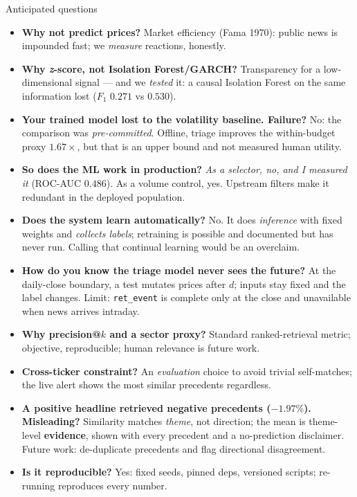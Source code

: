 \documentclass[aspectratio=169]{beamer}
\begin{document}
\begin{frame}{Anticipated questions}
\footnotesize
\begin{itemize}
  \item \textbf{Why not predict prices?} Market efficiency (Fama 1970): public news is impounded fast; we \emph{measure} reactions, honestly.
  \item \textbf{Why \emph{z}-score, not Isolation Forest/GARCH?} Transparency for a low-dimensional signal --- and we \emph{tested} it: a causal Isolation Forest on the same information lost ($F_1$ $0.271$ vs $0.530$).
  \item \textbf{Your trained model lost to the volatility baseline. Failure?} No: the comparison was \emph{pre-committed}. Offline, triage improves the within-budget proxy $1.67\times$, but that is an upper bound and not measured human utility.
  \item \textbf{So does the ML work in production?} \emph{As a selector, no, and I measured it} (ROC-AUC $0.486$). As a volume control, yes. Upstream filters make it redundant in the deployed population.
  \item \textbf{Does the system learn automatically?} No. It does \emph{inference} with fixed weights and \emph{collects labels}; retraining is possible and documented but has never run. Calling that continual learning would be an overclaim.
  \item \textbf{How do you know the triage model never sees the future?} At the daily-close boundary, a test mutates prices after $d$; inputs stay fixed and the label changes. Limit: \texttt{ret\_event} is complete only at the close and unavailable when news arrives intraday.
  \item \textbf{Why precision@$k$ and a sector proxy?} Standard ranked-retrieval metric; objective, reproducible; human relevance is future work.
  \item \textbf{Cross-ticker constraint?} An \emph{evaluation} choice to avoid trivial self-matches; the live alert shows the most similar precedents regardless.
  \item \textbf{A positive headline retrieved negative precedents ($-1.97\%$). Misleading?} Similarity matches \emph{theme}, not direction; the mean is theme-level \textbf{evidence}, shown with every precedent and a no-prediction disclaimer. Future work: de-duplicate precedents and flag directional disagreement.
  \item \textbf{Is it reproducible?} Yes: fixed seeds, pinned deps, versioned scripts; re-running reproduces every number.
\end{itemize}
\end{frame}
\end{document}
